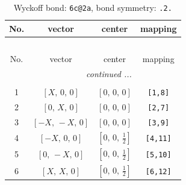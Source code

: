 \documentclass[fleqn,8pt]{jsarticle}
\begin{document}
\begin{longtable}{cccc}
\caption{Wyckoff bond: {\tt 6c@2a}, bond symmetry: {\tt .2.}}
 \\
 \hline \hline
No. & vector & center & mapping \\ \hline \endfirsthead

\multicolumn{3}{l}{\tablename\ \thetable{}} \\
 \hline \hline
No. & vector & center & mapping \\ \hline \endhead

 \hline \hline
\multicolumn{3}{r}{\footnotesize\it continued ...} \\ \endfoot

 \hline \hline
\multicolumn{3}{r}{} \\ \endlastfoot

1 & $\left[ X,\, 0,\, 0 \right]$ & $\left[ 0,\, 0,\, 0 \right]$ & {\tt [1,8]} \\ \hline
2 & $\left[ 0,\, X,\, 0 \right]$ & $\left[ 0,\, 0,\, 0 \right]$ & {\tt [2,7]} \\ \hline
3 & $\left[ - X,\, - X,\, 0 \right]$ & $\left[ 0,\, 0,\, 0 \right]$ & {\tt [3,9]} \\ \hline
4 & $\left[ - X,\, 0,\, 0 \right]$ & $\left[ 0,\, 0,\, \frac{1}{2} \right]$ & {\tt [4,11]} \\ \hline
5 & $\left[ 0,\, - X,\, 0 \right]$ & $\left[ 0,\, 0,\, \frac{1}{2} \right]$ & {\tt [5,10]} \\ \hline
6 & $\left[ X,\, X,\, 0 \right]$ & $\left[ 0,\, 0,\, \frac{1}{2} \right]$ & {\tt [6,12]} \\
\end{longtable}
\renewcommand{\arraystretch}{1.2}
\end{document}
